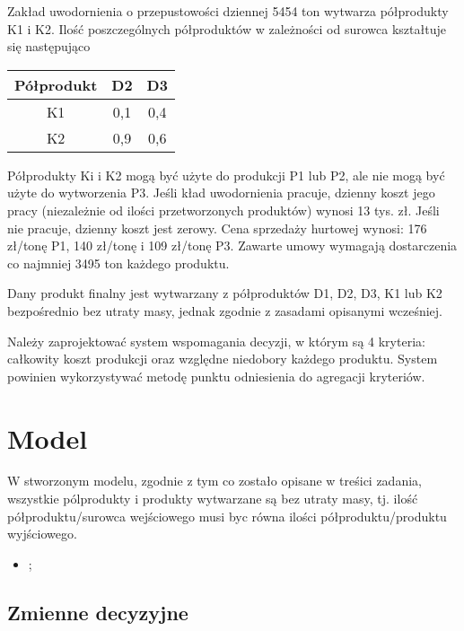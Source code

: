 \documentclass[a4paper,10pt,fleqn]{article}
\begin{document}
		Zakład uwodornienia o przepustowości dziennej 5454 ton wytwarza półprodukty K1 i K2. Ilość poszczególnych półproduktów w zależności od surowca kształtuje się następująco

		\begin{center}
		    \begin{tabular}{ | c | c | c |}
		    \hline
		    Półprodukt & D2 & D3 \\ \hline
			K1 & 0,1 & 0,4 \\ \hline
			K2 & 0,9 & 0,6 \\ \hline
		    \end{tabular}
		\end{center}

		Półprodukty Ki i K2 mogą być użyte do produkcji P1 lub P2, ale nie mogą być użyte do wytworzenia P3. Jeśli 
		kład uwodornienia pracuje, dzienny koszt jego pracy (niezależnie od ilości przetworzonych produktów) wynosi
		13 tys. zł. Jeśli nie pracuje, dzienny koszt jest zerowy. Cena sprzedaży hurtowej wynosi: 176 zł/tonę P1, 140 zł/tonę i
		109 zł/tonę P3. Zawarte umowy wymagają dostarczenia co najmniej 3495 ton każdego produktu.

		Dany produkt finalny jest wytwarzany z półproduktów D1, D2, D3, K1 lub K2 bezpośrednio bez utraty masy, jednak zgodnie
		z zasadami opisanymi wcześniej.

		Należy zaprojektować system wspomagania decyzji, w którym są 4 kryteria: całkowity koszt produkcji oraz względne niedobory
		każdego produktu. System powinien wykorzystywać metodę punktu odniesienia do agregacji kryteriów.

	\section{Model}
		W stworzonym modelu, zgodnie z tym co zostało opisane w treśici zadania, wszystkie pólprodukty i produkty wytwarzane są bez utraty masy, tj. ilość półproduktu/surowca wejściowego musi byc równa ilości półproduktu/produktu wyjściowego.
		\begin{itemize}
			\item ;
		\end{itemize}

		\subsection{Zmienne decyzyjne}
\end{document}
